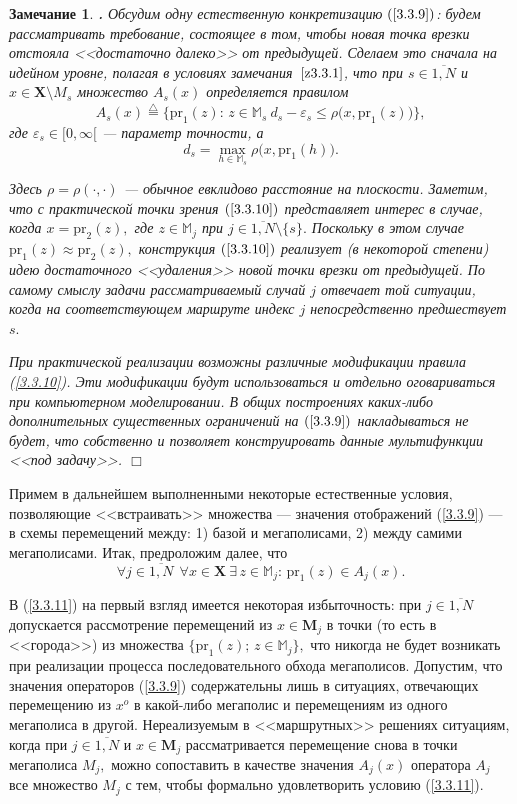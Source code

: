 \documentclass[11pt,twoside,openany]{report}
\newcommand{\bfn}{\begin{equation}}
\newcommand{\efn}{\end{equation}}
\newcommand{\df}{\stackrel{\triangle}{=}}
\newcommand{\ov}{\overline}
\newcounter{theo}
\newcounter{zam}
\newtheorem{zam}{Замечание}[section]
\newcommand{\TL}{\mbox{\bf{$\!\!$.}}}
\newcommand{\eps}{\varepsilon}
\newcommand{\sm}{\setminus}
\newcommand{\fa}{\forall}
\newcommand{\bbm}{{\mathbb M}}
\begin{document}
\begin{zam}
  \label{z3.3.2}{\TL}
Обсудим одну естественную конкретизацию $(\ref{3.3.9})$:
будем рассматривать
требование, состоящее в том, чтобы новая точка врезки отстояла <<достаточно далеко>>
от предыдущей.
Сделаем это сначала на идейном уровне,
полагая в условиях замечания~$\ref{z3.3.1}$,
что при $s\in \ov{1,N}$ и $x\in \mathbf{X}\sm M_s$
множество $A_s(x)$ определяется правилом
\bfn
  \label{3.3.10}
  A_s(x) \df \{\mathrm{pr}_1(z):\,z\in \bbm_s\
  d_s -\eps_s\leqslant\rho\bigl(x,\mathrm{pr}_1(z)\bigl)\},
\efn
где $\eps_s\in [0,\infty[$ --- параметр точности, а
$$
  d_s = \max\limits_{h\in \bbm_s}\rho\bigl(x,\mathrm{pr}_1(h)\bigl).
$$

Здесь
$\rho= \rho(\cdot,\cdot)$ --- обычное евклидово расстояние на
плоскости.
Заметим, что с практической точки зрения $(\ref{3.3.10})$
представляет интерес в случае, когда
$x = \mathrm{pr}_2(z),$
где $z\in \bbm_j$ при
$j\in \ov{1,N}\sm \{s\}.$
Поскольку в этом случае $\mathrm{pr}_1(z)\approx \mathrm{pr}_2(z),$
конструкция $(\ref{3.3.10})$
реализует (в некоторой степени) идею достаточного
<<удаления>> новой точки врезки от предыдущей.
По самому смыслу задачи
рассматриваемый случай $j$ отвечает той ситуации,
когда на соответствующем маршруте
индекс $j$ непосредственно предшествует $s.$

При практической реализации возможны различные модификации правила (\ref{3.3.10}).
Эти модификации будут использоваться и отдельно оговариваться при компьютерном
моделировании.
В общих построениях каких-либо дополнительных существенных ограничений
на $(\ref{3.3.9})$ накладываться не будет,
что собственно и позволяет конструировать
данные мультифункции <<под задачу>>.
\hfill $\Box$
\end{zam}

Примем
в дальнейшем выполненными некоторые естественные условия,
позволяющие <<встраивать>> множества --- значения отображений (\ref{3.3.9}) ---
в схемы перемещений между:
1) базой и мегаполисами,
2) между самими мегаполисами.
Итак, предроложим далее, что
\bfn
  \label{3.3.11}
  \fa j\in\ov{1,N}\ \ \fa x \in \mathbf{X}\ \exists\, z\in
  \bbm_j:\,\mathrm{pr}_1(z)\in A_j(x).
\efn

В (\ref{3.3.11}) на первый взгляд имеется некоторая избыточность:
при $j\in\ov{1,N}$
допускается рассмотрение перемещений из
$x\in \mathbf{M}_j$ в точки
(то есть в <<города>>)
из множества $\{\mathrm{pr}_1(z);\, z\in \bbm_j\},$
что никогда не будет возникать при реализации процесса последовательного обхода мегаполисов.
Допустим,
что значения операторов (\ref{3.3.9})
содержательны лишь в
ситуациях, отвечающих перемещению из $x^o$ в какой-либо мегаполис и перемещениям
из одного мегаполиса в другой.
Нереализуемым в <<маршрутных>> решениях ситуациям,
когда при
$j\in \ov{1,N}$ и $x\in \mathbf{M}_j$
рассматривается перемещение снова
в точки мегаполиса $M_j,$ можно сопоставить в качестве значения
$A_j(x)$ оператора
$A_j$ все множество $M_j$ с тем,
чтобы формально удовлетворить условию (\ref{3.3.11}).
\end{document}

